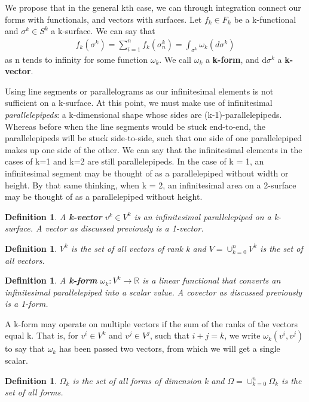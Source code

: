 \documentclass{book}
\newtheorem{defn}[equation]{Definition}
\begin{document}
We propose that in the general kth case, we can through integration connect our forms with functionals, and vectors with surfaces. Let $f_k \in F_k$ be a k-functional and $\sigma^k \in S^k$ a k-surface. We can say that \begin{gather}f_k(\sigma^k) = \sum_{i=1}^n f_k(\sigma^k_n) = \int_{\sigma^k} \omega_k(d\sigma^k)\end{gather} as n tends to infinity for some function $\omega_k$. We call $\omega_k$ a \textbf{k-form}, and d$\sigma^k$ a \textbf{k-vector}. 

Using line segments or parallelograms as our infinitesimal elements is not sufficient on a k-surface. At this point, we must make use of infinitesimal \emph{parallelepipeds}: a k-dimensional shape whose sides are (k-1)-parallelepipeds. Whereas before when the line segments would be stuck end-to-end, the parallelepipeds will be stuck side-to-side, such that one side of one parallelepiped makes up one side of the other. We can say that the infinitesimal elements in the cases of k=1 and k=2 are still parallelepipeds. In the case of k = 1, an infinitesimal segment may be thought of as a parallelepiped without width or height. By that same thinking, when k = 2, an infinitesimal area on a 2-surface may be thought of as a parallelepiped without height. 


\begin{defn}
	A \textbf{k-vector} $v^k \in V^k$ is an infinitesimal parallelepiped on a k-surface. A vector as discussed previously is a 1-vector. 
\end{defn}


\begin{defn}
	$V^k$ is the set of all vectors of rank k and $V = \cup_{k=0}^n V^k$ is the set of all vectors. 
	\end{defn}
 

\begin{defn}
	A \textbf{k-form} $\omega_k : V^k \to \mathbb{R}$ is a linear functional that converts an infinitesimal parallelepiped into a scalar value. A covector as discussed previously is a 1-form. 
\end{defn}

A k-form may operate on multiple vectors if the sum of the ranks of the vectors equal k. That is, for $v^i \in V^k$ and $v^j \in V^j$, such that $i + j = k$, we write $\omega_k(v^i, v^j)$ to say that $\omega_k$ has been passed two vectors, from which we will get a single scalar. 


\begin{defn}
	$\Omega_k$ is the set of all forms of dimension k and $\Omega = \cup_{k=0}^n\Omega_k$ is the set of all forms. 
\end{defn}
\end{document}
